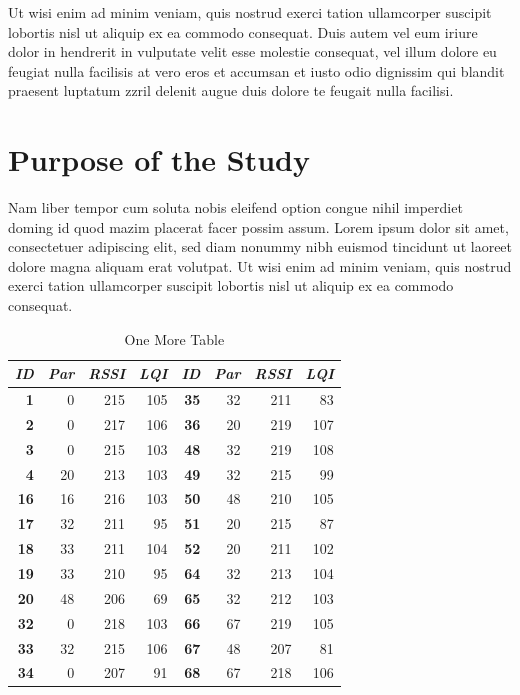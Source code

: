 Ut wisi enim ad minim veniam, quis nostrud exerci tation ullamcorper suscipit
lobortis nisl ut aliquip ex ea commodo consequat. Duis autem vel eum iriure
dolor in hendrerit in vulputate velit esse molestie consequat, vel illum dolore
eu feugiat nulla facilisis at vero eros et accumsan et iusto odio dignissim qui
blandit praesent luptatum zzril delenit augue duis dolore te feugait nulla
facilisi.

\section{Purpose of the Study}
Nam liber tempor cum soluta nobis eleifend option congue nihil imperdiet doming
id quod mazim placerat facer possim assum. Lorem ipsum dolor sit amet,
consectetuer adipiscing elit, sed diam nonummy nibh euismod tincidunt ut laoreet
dolore magna aliquam erat volutpat. Ut wisi enim ad minim veniam, quis nostrud
exerci tation ullamcorper suscipit lobortis nisl ut aliquip ex ea commodo
consequat.

\begin{table}
\begin{center}
\begin{tabular}{|r|r|r|r||r|r|r|r|}
\hline \textbf{\textit{ID}} & \textbf{\textit{Par}} & \textbf{\textit{RSSI}} &
\textbf{\textit{LQI}} &
\textbf{\textit{ID}} & \textbf{\textit{Par}} & \textbf{\textit{RSSI}} & \textbf{\textit{LQI}} \\
\hline \hline
\textbf{1}  &  0 & 215 & 105 & \textbf{35} & 32 & 211 &  83 \\
\textbf{2}  &  0 & 217 & 106 & \textbf{36} & 20 & 219 & 107 \\
\textbf{3}  &  0 & 215 & 103 & \textbf{48} & 32 & 219 & 108 \\
\textbf{4}  & 20 & 213 & 103 & \textbf{49} & 32 & 215 &  99 \\
\textbf{16} & 16 & 216 & 103 & \textbf{50} & 48 & 210 & 105 \\
\textbf{17} & 32 & 211 &  95 & \textbf{51} & 20 & 215 &  87 \\
\textbf{18} & 33 & 211 & 104 & \textbf{52} & 20 & 211 & 102 \\
\textbf{19} & 33 & 210 &  95 & \textbf{64} & 32 & 213 & 104 \\
\textbf{20} & 48 & 206 &  69 & \textbf{65} & 32 & 212 & 103 \\
\textbf{32} &  0 & 218 & 103 & \textbf{66} & 67 & 219 & 105 \\
\textbf{33} & 32 & 215 & 106 & \textbf{67} & 48 & 207 &  81 \\
\textbf{34} &  0 & 207 &  91 & \textbf{68} & 67 & 218 & 106 \\
\hline
\end{tabular}
\caption{One More Table}
\end{center}
\end{table}


